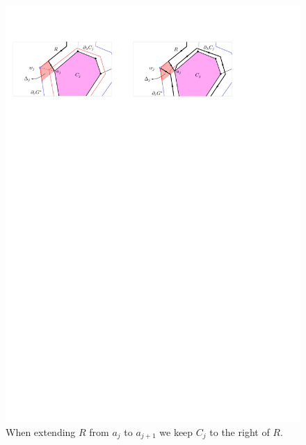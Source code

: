 \documentclass{patmorin}
\begin{document}

\begin{figure}[t]
\centering
\includegraphics{img/ComponentToTheRight.pdf}
\caption{\small When extending $R$ from $a_j$ to $a_{j+1}$ we keep $C_j$ to the right of $R$.}
\label{fig: Component to the right}
\end{figure}
\end{document}
